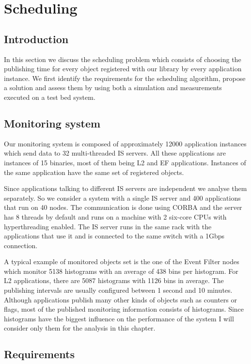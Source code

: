 \chapter{Scheduling} %
\label{Capitolul4}

\section{Introduction}

In this section we discuss the scheduling problem which consists of choosing the publishing time for every object registered with our library by every application instance. We first identify the requirements for the scheduling algorithm, propose a solution and assess them by using both a simulation and measurements executed on a test bed system.

\section{Monitoring system}

Our monitoring system is composed of approximately 12000 application instances which send data to 32 multi-threaded IS servers.  All these applications are instances of 15 binaries, most of them being L2 and EF applications. Instances of the same application have the same set of registered objects.

Since applications talking to different IS servers are independent we analyse them separately. So we consider a system with a single IS server and 400 applications that run on 40 nodes. The communication is done using CORBA and the server has 8 threads by default and runs on a machine with 2 six-core CPUs with hyperthreading enabled. The IS server runs in the same rack with the applications that use it and is connected to the same switch with a 1Gbps connection.

A typical example of monitored objects set is the one of the Event Filter nodes which monitor 5138 histograms with an average of 438 bins per histogram. For L2 applications, there are 5087 histograms with 1126 bins in average. The publishing intervals are usually configured between 1 second and 10 minutes. Although applications publish many other kinds of objects such as counters or flags, most of the published monitoring information consists of histograms. Since histograms have the biggest influence on the performance of the system I will consider only them for the analysis in this chapter.

\section{Requirements}

